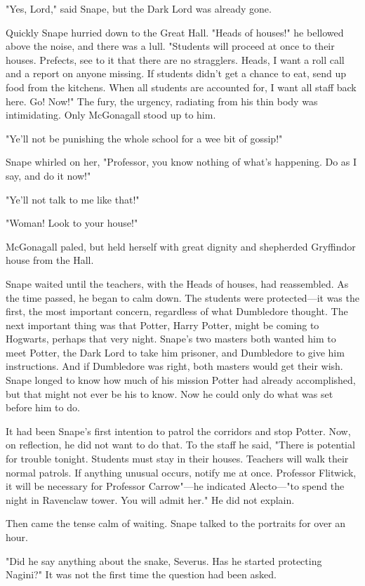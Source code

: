 "Yes, Lord," said Snape, but the Dark Lord was already gone.

Quickly Snape hurried down to the Great Hall. "Heads of houses!" he bellowed above the noise, and there was a lull. "Students will proceed at once to their houses. Prefects, see to it that there are no stragglers. Heads, I want a roll call and a report on anyone missing. If students didn't get a chance to eat, send up food from the kitchens. When all students are accounted for, I want all staff back here. Go! Now!" The fury, the urgency, radiating from his thin body was intimidating. Only McGonagall stood up to him.

"Ye'll not be punishing the whole school for a wee bit of gossip!"

Snape whirled on her, "Professor, you know nothing of what's happening. Do as I say, and do it now!"

"Ye'll not talk to me like that!"

"Woman! Look to your house!"

McGonagall paled, but held herself with great dignity and shepherded Gryffindor house from the Hall.

Snape waited until the teachers, with the Heads of houses, had reassembled. As the time passed, he began to calm down. The students were protected—it was the first, the most important concern, regardless of what Dumbledore thought. The next important thing was that Potter, Harry Potter, might be coming to Hogwarts, perhaps that very night. Snape's two masters both wanted him to meet Potter, the Dark Lord to take him prisoner, and Dumbledore to give him instructions. And if Dumbledore was right, both masters would get their wish. Snape longed to know how much of his mission Potter had already accomplished, but that might not ever be his to know. Now he could only do what was set before him to do.

It had been Snape's first intention to patrol the corridors and stop Potter. Now, on reflection, he did not want to do that. To the staff he said, "There is potential for trouble tonight. Students must stay in their houses. Teachers will walk their normal patrols. If anything unusual occurs, notify me at once. Professor Flitwick, it will be necessary for Professor Carrow"—he indicated Alecto—"to spend the night in Ravenclaw tower. You will admit her." He did not explain.

Then came the tense calm of waiting. Snape talked to the portraits for over an hour.

"Did he say anything about the snake, Severus. Has he started protecting Nagini?" It was not the first time the question had been asked.

